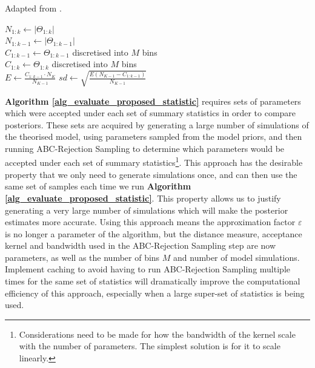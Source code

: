\documentclass[11pt,a4paper]{article}
\theoremstyle{break}
\begin{document}
  \begin{box_algorithm}\label{alg_evaluate_proposed_statistic}
    Adapted from \cite[]{Approximately_sufficient_statistics_and_bayesian_computation}.
    \begin{algorithm}[H]
      $N_{1:k}\leftarrow\left|\Theta_{1:k}\right|$\\
      $N_{1:k-1}\leftarrow\left|\Theta_{1:k-1}\right|$\\
      $C_{1:k-1}\leftarrow\Theta_{1:k-1}$ discretised into $M$ bins\\
      $C_{1:k}\leftarrow\Theta_{1:k}$ discretised into $M$ bins\\
      $E\leftarrow\displaystyle\frac{C_{1:k-1}\cdot N_K}{N_{K-1}}$\label{alg_expected_value}
      $sd\leftarrow\displaystyle\sqrt{\frac{E(N_{K-1}-C_{1:k-1})}{N_{K-1}}}$\label{alg_standard_deviation}
       { \label{alg_line_condition}
      } 
    \end{algorithm}
  \end{box_algorithm}

  \par \textbf{Algorithm \ref{alg_evaluate_proposed_statistic}} requires sets of parameters which were accepted under each set of summary statistics in order to compare posteriors. These sets are acquired by generating a large number of simulations of the theorised model, using parameters sampled from the model priors, and then running ABC-Rejection Sampling to determine which parameters would be accepted under each set of summary statistics\footnote{Considerations need to be made for how the bandwidth of the kernel scale with the number of parameters. The simplest solution is for it to scale linearly.}. This approach has the desirable property that we only need to generate simulations once, and can then use the same set of samples each time we run \textbf{Algorithm \ref{alg_evaluate_proposed_statistic}}. This property allows us to justify generating a very large number of simulations which will make the posterior estimates more accurate. Using this approach means the approximation factor $\varepsilon$ is no longer a parameter of the algorithm, but the distance measure, acceptance kernel and bandwidth used in the ABC-Rejection Sampling step are now parameters, as well as the number of bins $M$ and number of model simulations. Implement caching to avoid having to run ABC-Rejection Sampling multiple times for the same set of statistics will dramatically improve the computational efficiency of this approach, especially when a large super-set of statistics is being used.
\end{document}
